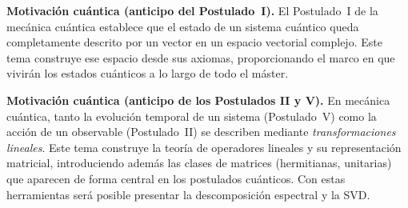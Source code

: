 \documentclass[]{unirTema}
\begin{document}
\begin{info}
  \textbf{Motivación cuántica (anticipo del Postulado~I).}
  El Postulado~I de la mecánica cuántica establece que el estado de un sistema cuántico
  queda completamente descrito por un vector en un espacio vectorial complejo.
  Este tema construye ese espacio desde sus axiomas, proporcionando el marco en que
  vivirán los estados cuánticos a lo largo de todo el máster.
\end{info}

\begin{esquemaExplorador}
\end{esquemaExplorador}


\portada

\begin{info}
  \textbf{Motivación cuántica (anticipo de los Postulados II y V).}
  En mecánica cuántica, tanto la evolución temporal de un sistema (Postulado~V)
  como la acción de un observable (Postulado~II) se describen mediante
  \emph{transformaciones lineales}.
  Este tema construye la teoría de operadores lineales y su representación matricial,
  introduciendo además las clases de matrices (hermitianas, unitarias) que aparecen
  de forma central en los postulados cuánticos.
  Con estas herramientas será posible presentar la descomposición espectral y la SVD.
\end{info}
\end{document}
